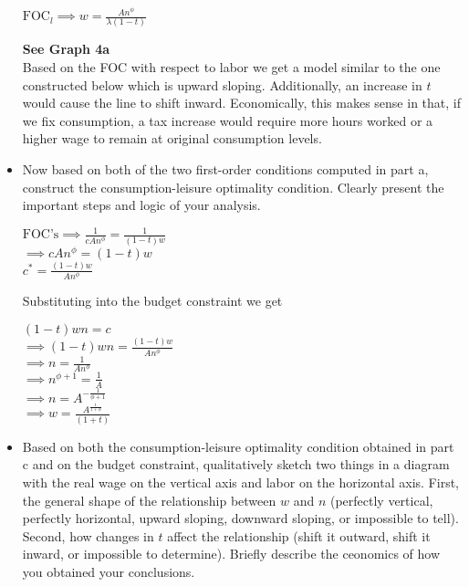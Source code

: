 \documentclass[11pt]{SelfArxOneColBMN}
\begin{document}
\begin{exercise}
\begin{itemize}
		\begin{solution}
			\begin{center}
				$\text{FOC}_l \implies w = \frac{An^\phi}{\lambda(1 - t)}$
			\end{center}
			\textbf{See Graph 4a}\\
		Based on the FOC with respect to labor we get a model similar to the one constructed below which is upward sloping. Additionally, an increase in $t$ would cause the line to shift inward. Economically, this makes sense in that, if we fix consumption, a tax increase would require more hours worked or a higher wage to remain at original consumption levels.\\
		\end{solution}
		\item Now based on both of the two first-order conditions computed in part a, construct the consumption-leisure optimality condition. Clearly present the important steps and logic of your analysis.
		\begin{solution}
			\begin{center}
				$\text{FOC's} \implies \frac{1}{cAn^\phi} = \frac{1}{(1 - t)w}$\\
				$\implies cAn^\phi = (1 - t)w$\\
				$c^* = \frac{(1 - t)w}{An^\phi}$
			\end{center}
		Substituting into the budget constraint we get
			\begin{center}
				$(1 - t)wn = c$\\
				$\implies(1 - t)wn = \frac{(1 - t)w}{An^\phi}$\\
				$\implies n = \frac{1}{An^\phi}$\\
				$\implies n^{\phi + 1} = \frac{1}{A}$\\
				$\implies n =  A^{-\frac{1}{\phi + 1}}$\\
				$\implies w = \frac{A^{\frac{1}{1 + \phi}}}{(1 + t)}$
			\end{center}
		\end{solution}
		\item Based on both the consumption-leisure optimality condition obtained in part c and on the budget constraint, qualitatively sketch two things in a diagram with the real wage on the vertical axis and labor on the horizontal axis. First, the general shape of the relationship between $w$ and $n$ (perfectly vertical, perfectly horizontal, upward sloping, downward sloping, or impossible to tell). Second, how changes in $t$ affect the relationship (shift it outward, shift it inward, or impossible to determine). Briefly describe the ceonomics of how you obtained your conclusions.

\end{itemize}
\end{exercise}
\end{document}

